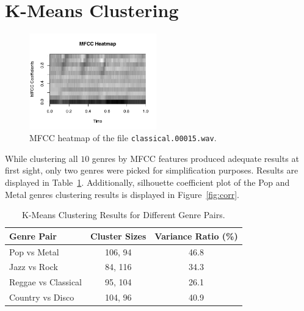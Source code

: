\documentclass[twocolumn]{article}
\begin{document}
\section{K-Means Clustering}
\begin{figure}[hht]
\centering
\includegraphics[width=0.49\textwidth]{images/mfcc_heatmap_8.pdf}
\caption{MFCC heatmap of the file \texttt{classical.00015.wav}.}
\label{fig:mfcc}
\end{figure}
While clustering all $10$ genres by MFCC features produced adequate results at first sight, only two genres were picked for simplification purposes. Results are displayed in Table~\ref{table:clustering_results}. Additionally, silhouette coefficient plot of the Pop and Metal genres clustering results is displayed in Figure~\ref{fig:corr}.
\begin{table}[H]
\centering
\begin{tabular}{lcc}
  \hline
 \textbf{Genre Pair} & \textbf{Cluster Sizes} & \textbf{Variance Ratio (\%)} \\
  \hline
 Pop vs Metal & 106, 94 & 46.8 \\
 Jazz vs Rock & 84, 116 & 34.3 \\
 Reggae vs Classical & 95, 104 & 26.1 \\
 Country vs Disco & 104, 96 & 40.9 \\
  \hline
\end{tabular}
\caption{K-Means Clustering Results for Different Genre Pairs.}
\label{table:clustering_results}
\end{table}
\end{document}
